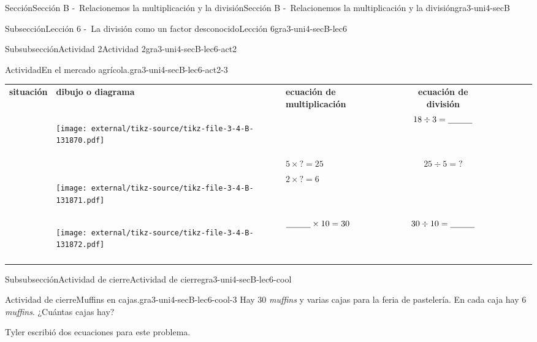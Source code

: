 \documentclass[twoside,10pt,]{article}
\newcommand{\hrulethin}  {\noalign{\hrule height 0.04em}}
\newcommand{\hrulethick} {\noalign{\hrule height 0.11em}}
\begin{document}
\begin{sectionptx}{Sección}{Sección B -~Relacionemos la multiplicación y la división}{}{Sección B -~Relacionemos la multiplicación y la división}{}{}{gra3-uni4-secB}
\begin{subsectionptx}{Subsección}{Lección 6 -~La división como un factor desconocido}{}{Lección 6}{}{}{gra3-uni4-secB-lec6}
\begin{subsubsectionptx}{Subsubsección}{Actividad 2}{}{Actividad 2}{}{}{gra3-uni4-secB-lec6-act2}
\begin{activity}{Actividad}{En el mercado agrícola.}{gra3-uni4-secB-lec6-act2-3}
\begin{center}
{\begin{tabular}{AlAcAcAcA}
{\bfseries{}situación}&{\bfseries{}dibujo o diagrama}&{\bfseries{}ecuación de multiplicación}&{\bfseries{}ecuación de división}\tabularnewline\hrulethick
{}&\begin{image}{0}{1}{0}{}%
\texttt{[image: external/tikz-source/tikz-file-3-4-B-131870.pdf]}
\end{image}%
&&\(18 \div 3 = \underline{\hspace{1 cm}}\)\tabularnewline\hrulethin
{}&&\(5 \times {?} = 25\)&\(25 \div 5 = {?}\)\tabularnewline\hrulethin
{}&\begin{image}{0}{1}{0}{}%
\texttt{[image: external/tikz-source/tikz-file-3-4-B-131871.pdf]}
\end{image}%
&\(2 \times{ ?} = 6\)&\tabularnewline\hrulethin
&\begin{image}{0}{1}{0}{}%
\texttt{[image: external/tikz-source/tikz-file-3-4-B-131872.pdf]}
\end{image}%
&\(\underline{\hspace{1 cm}} \times 10 = 30\)&\(30 \div 10 = \underline{\hspace{1 cm}}\)\tabularnewline\hrulethin
\end{tabular}
}%
\end{center}%
\end{activity}%
\end{subsubsectionptx}
%
%
\typeout{************************************************}
\typeout{************************************************}
%
\begin{subsubsectionptx}{Subsubsección}{Actividad de cierre}{}{Actividad de cierre}{}{}{gra3-uni4-secB-lec6-cool}
\begin{project}{Actividad de cierre}{Muffins en cajas.}{gra3-uni4-secB-lec6-cool-3}%
Hay 30 \emph{muffins} y varias cajas para la feria de pastelería. En cada caja hay 6 \emph{muffins}. ¿Cuántas cajas hay?%
\begin{sidebyside}{2}{0.05}{0.05}{0.1}%
\begin{sbspanel}{0.4}%
Tyler escribió dos ecuaciones para este problema.%

\end{sbspanel}
\end{sidebyside}
\end{project}
\end{subsubsectionptx}
\end{subsectionptx}
\end{sectionptx}
\end{document}
